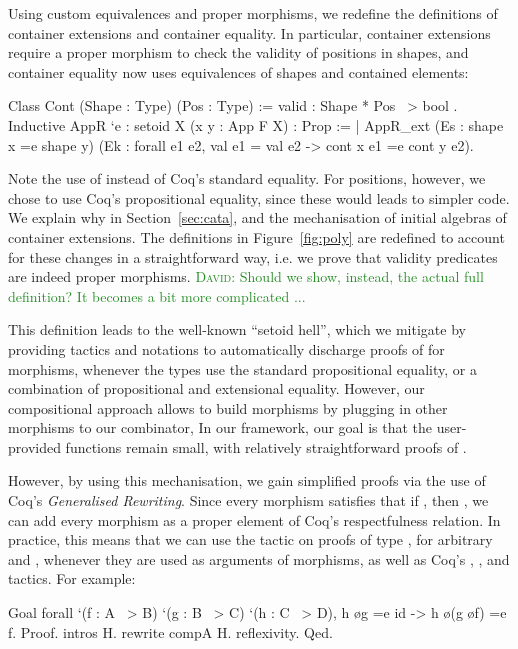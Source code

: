 \documentclass[anonymous, a4paper, UKenglish, cleveref, autoref, thm-restate]{lipics-v2021}
\newcommand{\dcas}[1]{\textcolor{ForestGreen}{\textsc{David}: #1}}
\begin{document}
Using custom equivalences and proper morphisms, we redefine the definitions of
container extensions and container equality. In particular, container
extensions require a proper morphism to check the validity of positions in
shapes, and container equality now uses equivalences of shapes and contained
elements: 
\begin{coqcode}
Class Cont (Shape : Type) (Pos : Type) := { valid : Shape * Pos ~> bool }.
Inductive AppR `{e : setoid X} (x y : App F X) : Prop :=
  | AppR_ext (Es : shape x =e shape y)
             (Ek : forall e1 e2, val e1 = val e2 -> cont x e1 =e cont y e2).
\end{coqcode}
Note the use of  instead of Coq's standard equality.  For positions,
however, we chose to use Coq's propositional equality, since these would leads
to simpler code. We explain why in Section~\ref{sec:cata}, and the
mechanisation of initial algebras of container extensions. The definitions in
Figure~\ref{fig:poly} are redefined to account for these changes in a
straightforward way, i.e. we prove that validity predicates are indeed proper
morphisms.  \dcas{Should we show, instead, the actual full definition? It
becomes a bit more complicated ...}

This definition leads to the well-known ``setoid hell'', which we mitigate by
providing tactics and notations to automatically discharge proofs of
 for morphisms, whenever the types use the standard propositional
equality, or a combination of propositional and extensional equality. However,
our compositional approach allows to build morphisms by plugging in other
morphisms to our combinator, In our framework, our goal is that the
user-provided functions remain small, with relatively straightforward proofs of
.

However, by using this mechanisation, we gain simplified proofs via the use of
Coq's \emph{Generalised Rewriting}.  Since every morphism 
satisfies that if , then , we can add every
morphism as a proper element of Coq's respectfulness relation. In practice,
this means that we can use the  tactic on proofs of type 
, for arbitrary  and , whenever they are used as
arguments of morphisms, as well as Coq's , ,
and  tactics. For example:
\begin{coqcode}
Goal forall `(f : A ~> B) `(g : B ~> C) `(h : C ~> D), 
  h \o g =e id -> h \o (g \o f) =e f.
Proof.
  intros H.  rewrite compA H.  reflexivity.
Qed.
\end{coqcode}
\end{document}
